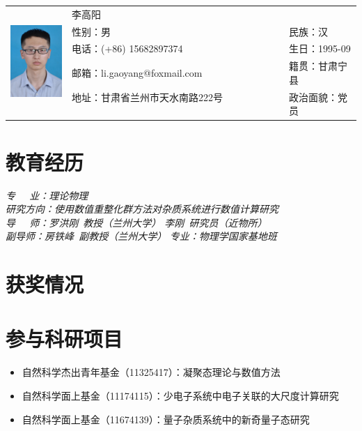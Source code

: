 \documentclass{resume}
\begin{document}

\Large{
  \begin{tabu}{ c l l }
    &
   \scshape{李高阳} &  \\
    & 性别：男 & 民族：汉 \\
    & 电话：(+86) 15682897374 & 生日：1995-09 \\
    & 邮箱：li.gaoyang@foxmail.com & 籍贯：甘肃宁县 \\
    & 地址：甘肃省兰州市天水南路222号 \ \ \ \ \ \ \ \ \ \ \ \ \ \ & 政治面貌：党员
  \end{tabu}
}

\section{教育经历}
\textit{专$\quad\ \ $业：理论物理}\\
\textit{研究方向：使用数值重整化群方法对杂质系统进行数值计算研究}\\
\textit{导$\quad\ \ $师：罗洪刚\ 教授（兰州大学） 李刚\ 研究员（近物所）}\\
\textit{副\hspace{7\ccwd}导\hspace{7\ccwd}师：房铁峰\ 副教授（兰州大学）}
\textit{专业：物理学国家基地班}

\section{获奖情况}

\section{参与科研项目}
\begin{itemize}
\item 自然科学杰出青年基金（11325417）：凝聚态理论与数值方法
\item 自然科学面上基金（11174115）：少电子系统中电子关联的大尺度计算研究
\item 自然科学面上基金（11674139）：量子杂质系统中的新奇量子态研究
\end{itemize}
\end{document}
